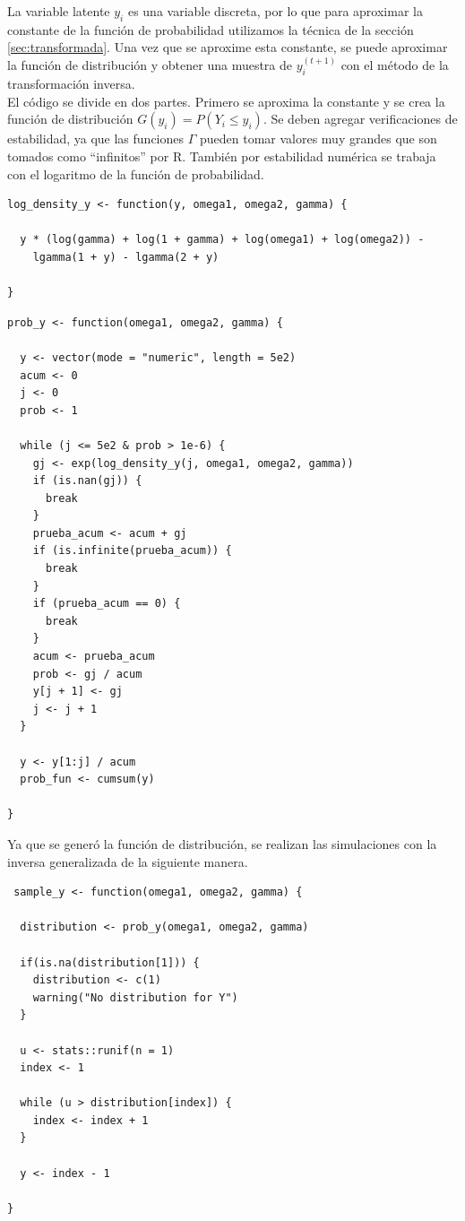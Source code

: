 \documentclass[11pt,a4paper]{article}
\begin{document}
La variable latente $y_i$ es una variable discreta, por lo que para aproximar la constante de la función de probabilidad utilizamos la técnica de la sección \ref{sec:transformada}. Una vez que se aproxime esta constante, se puede aproximar la función de distribución y obtener una muestra de $y_i^{(t+1)}$ con el método de la transformación inversa.\\

El código se divide en dos partes. Primero se aproxima la constante y se crea la función de distribución $G(y_i) = P(Y_i \leq y_i)$. Se deben agregar verificaciones de estabilidad, ya que las funciones $\Gamma$ pueden tomar valores muy grandes que son tomados como ``infinitos'' por R. También por estabilidad numérica se trabaja con el logaritmo de la función de probabilidad.\\

\begin{lstlisting}
log_density_y <- function(y, omega1, omega2, gamma) {

  y * (log(gamma) + log(1 + gamma) + log(omega1) + log(omega2)) -
    lgamma(1 + y) - lgamma(2 + y)

}
\end{lstlisting}

\newpage

\begin{lstlisting}
prob_y <- function(omega1, omega2, gamma) {

  y <- vector(mode = "numeric", length = 5e2)
  acum <- 0
  j <- 0
  prob <- 1

  while (j <= 5e2 & prob > 1e-6) {
    gj <- exp(log_density_y(j, omega1, omega2, gamma))
    if (is.nan(gj)) {
      break
    }
    prueba_acum <- acum + gj
    if (is.infinite(prueba_acum)) {
      break
    }
    if (prueba_acum == 0) {
      break
    }
    acum <- prueba_acum
    prob <- gj / acum
    y[j + 1] <- gj
    j <- j + 1
  }

  y <- y[1:j] / acum
  prob_fun <- cumsum(y)

}
\end{lstlisting}\leavevmode\newline

Ya que se generó la función de distribución, se realizan las simulaciones con la inversa generalizada de la siguiente manera.\\

\begin{lstlisting}
 sample_y <- function(omega1, omega2, gamma) {

  distribution <- prob_y(omega1, omega2, gamma)

  if(is.na(distribution[1])) {
    distribution <- c(1)
    warning("No distribution for Y")
  }

  u <- stats::runif(n = 1)
  index <- 1

  while (u > distribution[index]) {
    index <- index + 1
  }

  y <- index - 1

}
\end{lstlisting}\leavevmode\newline
\end{document}
